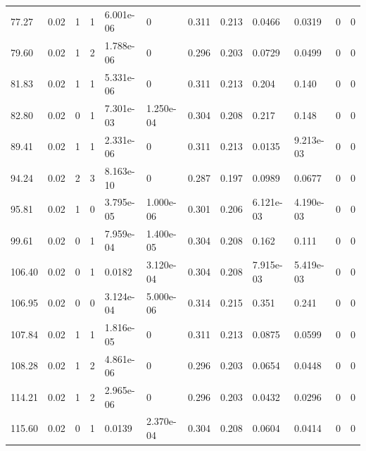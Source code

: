 \documentclass[preview]{standalone}
\begin{document}
{{\begin{tabular}{L{1.2cm}C{1.2cm} C{0.3cm}C{0.5cm} C{1.4cm}C{1.4cm} C{1.4cm}C{1.4cm} C{1.6cm}C{1.6cm} C{1.6cm}C{1.6cm}}
  77.27  &  0.02  & 1     &  1 &  6.001e-06  & 0  &  0.311&   0.213& 0.0466 & 0.0319   &  0 & 0  \\ 
  79.60  &  0.02  & 1     &  2 &  1.788e-06  & 0  &  0.296&   0.203& 0.0729 & 0.0499   &  0 & 0  \\ 
  81.83  &  0.02  & 1     &  1 &  5.331e-06  & 0  &  0.311&   0.213& 0.204 & 0.140   &  0 & 0  \\ 
  82.80  &  0.02  & 0     &  1 &  7.301e-03  & 1.250e-04  &  0.304&   0.208& 0.217 & 0.148   &  0 & 0  \\ 
  89.41  &  0.02  & 1     &  1 &  2.331e-06  & 0  &  0.311&   0.213& 0.0135 & 9.213e-03   &  0 & 0  \\ 
  94.24  &  0.02  & 2     &  3 &  8.163e-10  & 0  &  0.287&   0.197& 0.0989 & 0.0677   &  0 & 0  \\ 
  95.81  &  0.02  & 1     &  0 &  3.795e-05  & 1.000e-06  &  0.301&   0.206& 6.121e-03 & 4.190e-03   &  0 & 0  \\ 
  99.61  &  0.02  & 0     &  1 &  7.959e-04  & 1.400e-05  &  0.304&   0.208& 0.162 & 0.111   &  0 & 0  \\ 
  106.40  &  0.02  & 0     &  1 &  0.0182  & 3.120e-04  &  0.304&   0.208& 7.915e-03 & 5.419e-03   &  0 & 0  \\ 
  106.95  &  0.02  & 0     &  0 &  3.124e-04  & 5.000e-06  &  0.314&   0.215& 0.351 & 0.241   &  0 & 0  \\ 
  107.84  &  0.02  & 1     &  1 &  1.816e-05  & 0  &  0.311&   0.213& 0.0875 & 0.0599   &  0 & 0  \\ 
  108.28  &  0.02  & 1     &  2 &  4.861e-06  & 0  &  0.296&   0.203& 0.0654 & 0.0448   &  0 & 0  \\ 
  114.21  &  0.02  & 1     &  2 &  2.965e-06  & 0  &  0.296&   0.203& 0.0432 & 0.0296   &  0 & 0  \\ 
  115.60  &  0.02  & 0     &  1 &  0.0139  & 2.370e-04  &  0.304&   0.208& 0.0604 & 0.0414   &  0 & 0  \\ 
\hline 
\end{tabular} 

}}
\end{document}
